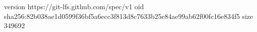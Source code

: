 version https://git-lfs.github.com/spec/v1
oid sha256:82b038ae1d0599f36bf5a6ecc3f813d8c7633b25e84ae99ab62f00fc16e834f5
size 349692
